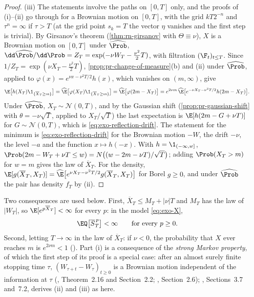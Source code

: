 \begin{proof}
(iii) The statements involve the paths on $[0,T]$ only, and the proofs of (i)--(ii) go through
for a Brownian motion on $[0,T]$, with the grid $kT2^{-n}$ and $\tau^n=\infty$ if $\tau>T$ (at the
grid point $s_k=T$ the vector $\eta$ vanishes and the first step is trivial).
By Girsanov's theorem (\cref{thm:rn-girsanov} with $\Theta\equiv\nu$), $X$ is a Brownian motion on
$[0,T]$ under $\widehat\Prob$, $\dd\widehat\Prob/\dd\Prob=Z_T=\exp(-\nu W_T-\frac{\nu^2}2T)$, with
filtration $(\F_t)_{t\le T}$. Since $1/Z_T=\exp(\nu X_T-\frac{\nu^2}2T)$, \cref{prop:pr-change-of-measure}(b)
and (ii) under $\widehat\Prob$, applied to $\varphi(x)=e^{\nu x-\nu^2T/2}h(x)$, which vanishes on
$(m,\infty)$, give
\[
  \E\big[h(X_T)\1_{\{\overline X_T\ge m\}}\big]=\widehat\E\big[\varphi(X_T)\1_{\{\overline X_T\ge m\}}\big]
  =\widehat\E\big[\varphi(2m-X_T)\big]
  =e^{2\nu m}\,\widehat\E\big[e^{-\nu X_T-\nu^2T/2}h(2m-X_T)\big].
\]
Under $\widehat\Prob$, $X_T\sim\mathcal N(0,T)$, and by the Gaussian shift
(\cref{prop:pr-gaussian-shift} with $\theta=-\nu\sqrt T$, applied to $X_T/\sqrt T$) the last
expectation is $\E[h(2m-G+\nu T)]$ for $G\sim\mathcal N(0,T)$, which is \eqref{eq:exo-reflection-drift}.
The statement for the minimum is \eqref{eq:exo-reflection-drift} for the Brownian motion $-W$,
the drift $-\nu$, the level $-a$ and the function $x\mapsto h(-x)$. With $h=\1_{(-\infty,w]}$,
$\Prob(2m-W_T+\nu T\le w)=N\big((w-2m-\nu T)/\sqrt T\big)$; adding $\Prob(X_T>m)$ for $w=m$ gives
the law of $\overline X_T$. For the density,
$\E[g(\overline X_T,X_T)]=\widehat\E\big[e^{\nu X_T-\nu^2T/2}g(\overline X_T,X_T)\big]$ for Borel
$g\ge0$, and under $\widehat\Prob$ the pair has density $f_T$ by (ii).
\end{proof}

Two consequences are used below. First, $\overline X_T\le M_T+|\nu|T$ and $M_T$ has the law of
$|W_T|$, so $\E[e^{p\overline X_T}]<\infty$ for every $p$: in the model \eqref{eq:exo-X},
\begin{equation}\label{eq:exo-moments}
  \EQ\big[\overline S_T^{\,p}\big]<\infty\qquad\text{for every }p\ge0 .
\end{equation}
Second, letting $T\to\infty$ in the law of $\overline X_T$: if $\nu<0$, the probability that $X$
ever reaches $m$ is $e^{2\nu m}<1$ (). Part (i) is a consequence of the
\emph{strong Markov property}, of which the first step of its proof is a special case: after an almost surely finite stopping time $\tau$,
$(W_{\tau+t}-W_\tau)_{t\ge0}$ is a Brownian motion independent of the information at $\tau$
(\textcite{morters-peres}, Theorem~2.16 and Section~2.2; \textcite{karatzas-shreve}, Section~2.6);
\textcite{shreve2}, Sections~3.7 and~7.2, derives (ii) and (iii) as here.


